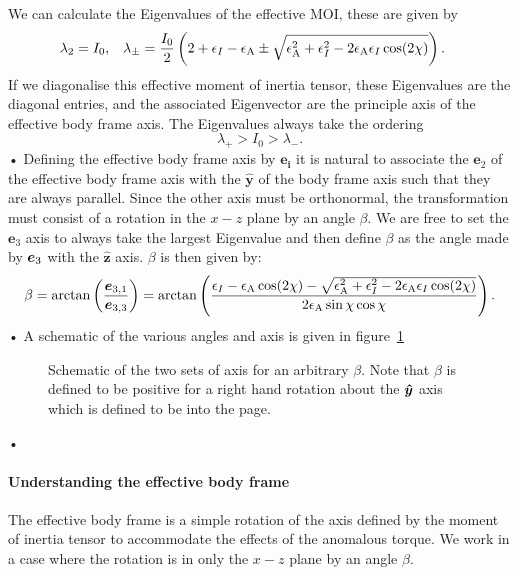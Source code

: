 \documentclass[../full_thesis/full_thesis.tex]{subfiles}
\newcommand{\thisdir}{../rotating_frame}
\begin{document}
We can calculate the Eigenvalues of the effective MOI, these are given by
\begin{align}
\lambda_{2}=I_{0}, &&&
\lambda_{\pm}=\frac{I_{0}}{2}
\left(2+\epsilon_{I}-\epsilon_{\mathrm{A}}\pm
\sqrt{\epsilon_{\mathrm{A}}^{2}+\epsilon_{I}^{2}-2\epsilon_{\mathrm{A}}\epsilon_{I}\cos(2\chi)}\right).
\end{align}
If we diagonalise this effective moment of inertia tensor, these Eigenvalues
are the diagonal entries, and the associated Eigenvector are the principle
axis of the effective body frame axis. The Eigenvalues always take the ordering
\begin{equation}
\lambda_{+}>I_{0}>\lambda_{-}.
\end{equation}•
Defining the effective body frame axis by $\boldsymbol{e_{i}}$ it is natural to
associate the $\boldsymbol{e}_{2}$ of the effective body frame axis with the
$\boldsymbol{\hat{y}}$ of the body frame axis such that they are always
parallel. Since the other axis must be orthonormal, the transformation must
consist of a rotation in the $x-z$ plane by an angle $\beta$. We are
free to set the $\boldsymbol{e}_{3}$ axis to always take the largest Eigenvalue
and then define $\beta$ as the angle made by $\boldsymbol{e}_{3}$ with the
$\hat{\boldsymbol{z}}$ axis. $\beta$ is then given by:
\begin{equation}
\beta = \arctan\left(\frac{\boldsymbol{e}_{3,1}}{\boldsymbol{e}_{3,3}}\right)
=\arctan\left( \frac{ \epsilon_{I}-\epsilon_{\mathrm{A}}\cos(2\chi)-
              \sqrt{\epsilon_{\mathrm{A}}^{2}+\epsilon_{I}^{2}-2\epsilon_{\mathrm{A}}\epsilon_{I}\cos(2\chi)}}
              {2\epsilon_{\mathrm{A}}\sin\chi \cos\chi}\right).
\label{eqn: beta}
\end{equation}•
A schematic of the various angles and axis is given in
figure~\ref{fig: schematic}
\begin{figure}[ht]
\centering
 
\caption{Schematic of the two sets of axis for an arbitrary $\beta$. Note that
$\beta$ is defined to be positive for a right hand rotation about the $\boldsymbol{\hat{y}}$ axis
which is defined to be into the page.}
\label{fig: schematic}
\end{figure}•

\paragraph{Understanding the effective body frame}
The effective body frame is a simple rotation of the axis defined by the moment
of inertia tensor to accommodate the effects of the anomalous torque. We work
in a case where the rotation is in only the $x-z$ plane by an angle
$\beta$.
\end{document}
